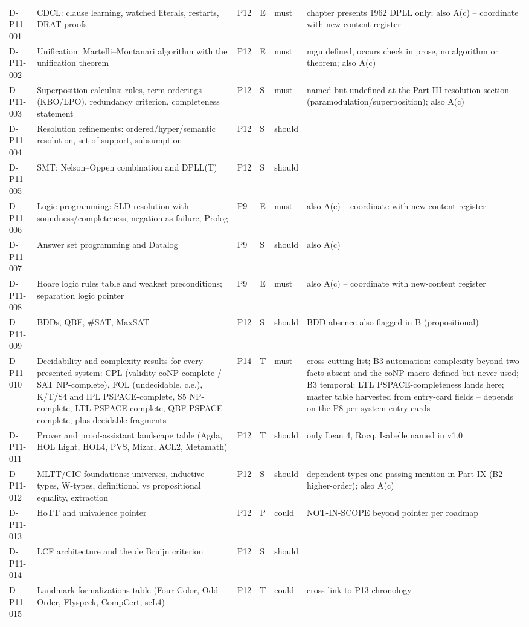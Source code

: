 \begin{longtable}{@{}p{0.62in}p{2.6in}p{0.75in}p{0.22in}p{0.42in}p{1.85in}@{}}
D-P11-001 & CDCL: clause learning, watched literals, restarts, DRAT proofs & P12 & E & must & chapter presents 1962 DPLL only; also A(c) -- coordinate with new-content register \\
D-P11-002 & Unification: Martelli--Montanari algorithm with the unification theorem & P12 & E & must & mgu defined, occurs check in prose, no algorithm or theorem; also A(c) \\
D-P11-003 & Superposition calculus: rules, term orderings (KBO/LPO), redundancy criterion, completeness statement & P12 & S & must & named but undefined at the Part III resolution section (paramodulation/superposition); also A(c) \\
D-P11-004 & Resolution refinements: ordered/hyper/semantic resolution, set-of-support, subsumption & P12 & S & should &  \\
D-P11-005 & SMT: Nelson--Oppen combination and DPLL(T) & P12 & S & should &  \\
D-P11-006 & Logic programming: SLD resolution with soundness/completeness, negation as failure, Prolog & P9 & E & must & also A(c) -- coordinate with new-content register \\
D-P11-007 & Answer set programming and Datalog & P9 & S & should & also A(c) \\
D-P11-008 & Hoare logic rules table and weakest preconditions; separation logic pointer & P9 & E & must & also A(c) -- coordinate with new-content register \\
D-P11-009 & BDDs, QBF, \#SAT, MaxSAT & P12 & S & should & BDD absence also flagged in B (propositional) \\
D-P11-010 & Decidability and complexity results for every presented system: CPL (validity coNP-complete / SAT NP-complete), FOL (undecidable, c.e.), K/T/S4 and IPL PSPACE-complete, S5 NP-complete, LTL PSPACE-complete, QBF PSPACE-complete, plus decidable fragments & P14 & T & must & cross-cutting list; B3 automation: complexity beyond two facts absent and the coNP macro defined but never used; B3 temporal: LTL PSPACE-completeness lands here; master table harvested from entry-card fields -- depends on the P8 per-system entry cards \\
D-P11-011 & Prover and proof-assistant landscape table (Agda, HOL Light, HOL4, PVS, Mizar, ACL2, Metamath) & P12 & T & should & only Lean 4, Rocq, Isabelle named in v1.0 \\
D-P11-012 & MLTT/CIC foundations: universes, inductive types, W-types, definitional vs propositional equality, extraction & P12 & S & should & dependent types one passing mention in Part IX (B2 higher-order); also A(c) \\
D-P11-013 & HoTT and univalence pointer & P12 & P & could & NOT-IN-SCOPE beyond pointer per roadmap \\
D-P11-014 & LCF architecture and the de Bruijn criterion & P12 & S & should &  \\
D-P11-015 & Landmark formalizations table (Four Color, Odd Order, Flyspeck, CompCert, seL4) & P12 & T & could & cross-link to P13 chronology \\
\end{longtable}
\endgroup
